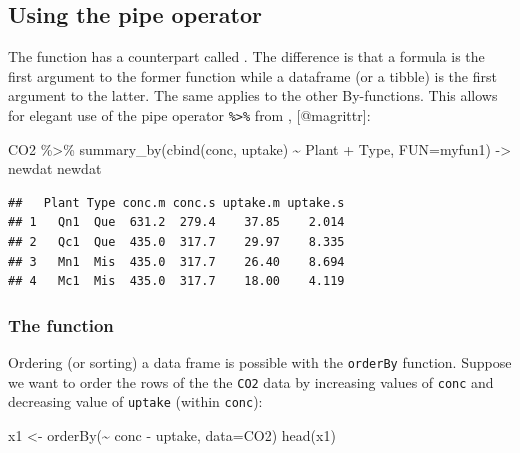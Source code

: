 \documentclass[
]{article}
\newenvironment{Shaded}{\begin{snugshade}}{\end{snugshade}}
\newcommand{\AttributeTok}[1]{\textcolor[rgb]{0.77,0.63,0.00}{#1}}
\newcommand{\FunctionTok}[1]{\textcolor[rgb]{0.00,0.00,0.00}{#1}}
\newcommand{\NormalTok}[1]{#1}
\newcommand{\OtherTok}[1]{\textcolor[rgb]{0.56,0.35,0.01}{#1}}
\newcommand{\SpecialCharTok}[1]{\textcolor[rgb]{0.00,0.00,0.00}{#1}}
\begin{document}
\hypertarget{using-the-pipe-operator}{%
\subsection{Using the pipe operator}\label{using-the-pipe-operator}}

The  function has a counterpart called
. The difference is that a formula is the first
argument to the former function while a dataframe (or a tibble) is the
first argument to the latter. The same applies to the other
By-functions. This allows for elegant use of the pipe operator
\texttt{\%\textgreater{}\%} from , {[}@magrittr{]}:

\begin{Shaded}
\begin{Highlighting}[]
\NormalTok{CO2 }\SpecialCharTok{\%\textgreater{}\%} \FunctionTok{summary\_by}\NormalTok{(}\FunctionTok{cbind}\NormalTok{(conc, uptake) }\SpecialCharTok{\textasciitilde{}}\NormalTok{ Plant }\SpecialCharTok{+}\NormalTok{ Type, }\AttributeTok{FUN=}\NormalTok{myfun1) }\OtherTok{{-}\textgreater{}}\NormalTok{ newdat}
\NormalTok{newdat}
\end{Highlighting}
\end{Shaded}

\begin{verbatim}
##   Plant Type conc.m conc.s uptake.m uptake.s
## 1   Qn1  Que  631.2  279.4    37.85    2.014
## 2   Qc1  Que  435.0  317.7    29.97    8.335
## 3   Mn1  Mis  435.0  317.7    26.40    8.694
## 4   Mc1  Mis  435.0  317.7    18.00    4.119
\end{verbatim}

\hypertarget{the-function-1}{%
\subsubsection{\texorpdfstring{The 
function}{The  function}}\label{the-function-1}}

Ordering (or sorting) a data frame is possible with the \texttt{orderBy}
function. Suppose we want to order the rows of the the \texttt{CO2} data
by increasing values of \texttt{conc} and decreasing value of
\texttt{uptake} (within \texttt{conc}):

\begin{Shaded}
\begin{Highlighting}[]
\NormalTok{x1 }\OtherTok{\textless{}{-}} \FunctionTok{orderBy}\NormalTok{(}\SpecialCharTok{\textasciitilde{}}\NormalTok{ conc }\SpecialCharTok{{-}}\NormalTok{ uptake, }\AttributeTok{data=}\NormalTok{CO2)}
\FunctionTok{head}\NormalTok{(x1)}
\end{Highlighting}
\end{Shaded}
\end{document}
